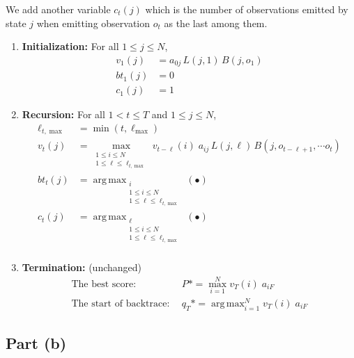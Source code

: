 \documentclass[11pt,a4paper,titlepage]{article}
\DeclareMathOperator*{\argmax}{arg\,max} %
\begin{document}
We add another variable $c_t(j)$ which is the number of observations emitted by
state $j$ when emitting observation $o_t$ as the last among them.
\begin{enumerate}
    \item \textbf{Initialization:} For all $1 \le j \le N$,
        \begin{align*}
            v_1(j) &= a_{0j} \, L(j, 1) \, B(j, o_1) \\
            bt_1(j) &= 0 \\
            c_1(j) &= 1
        \end{align*}
    \item \textbf{Recursion:} For all $1 < t \le T$ and $1 \le j \le N$,
        \begin{align*}
            \ell_{t, \max} &= \min(t, \ell_{\max}) \\
            v_t(j) &= \max_{\substack{1 \le i \le N \\ 1 \le \ell \le \ell_{t, \max}}} v_{t-\ell}(i) \;
                          a_{ij} \, L(j, \ell) \, B(j, o_{t-\ell+1}, \cdots o_t) \\
            bt_t(j) &= \argmax_{\substack{i \\ 1 \le i \le N \\ 1 \le \ell \le \ell_{t, \max}}} (\bullet) \\
            c_t(j) &= \argmax_{\substack{\ell \\ 1 \le i \le N \\ 1 \le \ell \le \ell_{t, \max}}} (\bullet) \\
        \end{align*}
    \item \textbf{Termination:} (unchanged)
        \begin{align*}
            \textrm{The best score:}&~~ P* = \max_{i=1}^N v_T(i) \; a_{iF} \\
            \textrm{The start of backtrace:}&~~ q_T* = \argmax_{i=1}^N v_T(i) \; a_{iF}
        \end{align*}
\end{enumerate}

\subsection*{Part (b)}
\end{document}
